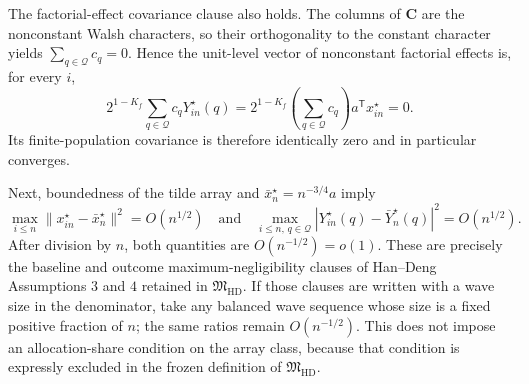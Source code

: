 The factorial-effect covariance clause also holds.  The columns of
\(\mathbf C\) are the nonconstant Walsh characters, so their orthogonality
to the constant character yields \(\sum_{q\in\mathcal Q}c_q=0\).  Hence the
unit-level vector of nonconstant factorial effects is, for every \(i\),
\[
2^{1-K_f}\sum_{q\in\mathcal Q}c_qY_{in}^{\star}(q)
=2^{1-K_f}\left(\sum_{q\in\mathcal Q}c_q\right)
  a^{\mathsf T}x_{in}^{\star}=0.
\]
Its finite-population covariance is therefore identically zero and in
particular converges.

Next, boundedness of the tilde array and
\(\bar x_n^{\star}=n^{-3/4}a\) imply
\[
\max_{i\le n}\lVert x_{in}^{\star}-\bar x_n^{\star}\rVert^2
=O(n^{1/2})
\quad\text{and}\quad
\max_{i\le n,\,q\in\mathcal Q}
 |Y_{in}^{\star}(q)-\bar Y_n^{\star}(q)|^2=O(n^{1/2}).
\]
After division by \(n\), both quantities are \(O(n^{-1/2})=o(1)\).
These are precisely the baseline and outcome maximum-negligibility clauses
of Han--Deng Assumptions \(3\) and \(4\) retained in
\(\mathfrak M_{\mathrm{HD}}\).  If those clauses are written with a wave
size in the denominator, take any balanced wave sequence whose size is a
fixed positive fraction of \(n\); the same ratios remain
\(O(n^{-1/2})\).  This does not impose an allocation-share condition on the
array class, because that condition is expressly excluded in the frozen
definition of \(\mathfrak M_{\mathrm{HD}}\).

